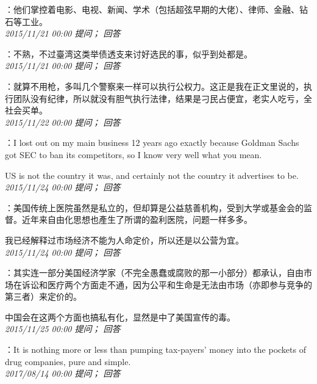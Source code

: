 \documentclass[twocolumn]{ctexart}
\begin{document}
：他们掌控着电影、电视、新闻、学术（包括超弦早期的大佬）、律师、金融、钻石等工业。\\

\textit{\hfill\noindent\small 2015/11/21 00:00 提问； 回答}

：不熟，不过臺湾这类举债透支来讨好选民的事，似乎到处都是。\\

\textit{\hfill\noindent\small 2015/11/21 00:00 提问； 回答}

：就算不用枪，多叫几个警察来一样可以执行公权力。这正是我在正文里说的，执行团队没有纪律，所以就没有胆气执行法律，结果是刁民占便宜，老实人吃亏，全社会买单。\\

\textit{\hfill\noindent\small 2015/11/22 00:00 提问； 回答}

：I lost out on my main business 12 years ago exactly because Goldman Sachs got SEC to ban its competitors, so I know very well what you mean.

US is not the country it was, and certainly not the country it advertises to be.\\

\textit{\hfill\noindent\small 2015/11/24 00:00 提问； 回答}

：美国传统上医院虽然是私立的，但却算是公益慈善机构，受到大学或基金会的监督。近年来自由化思想也產生了所谓的盈利医院，问题一样多多。

我已经解释过市场经济不能为人命定价，所以还是以公营为宜。\\

\textit{\hfill\noindent\small 2015/11/24 00:00 提问； 回答}

：其实连一部分美国经济学家（不完全愚蠢或腐败的那一小部分）都承认，自由市场在诉讼和医疗两个方面走不通，因为公平和生命是无法由市场（亦即参与竞争的第三者）来定价的。

中国会在这两个方面也搞私有化，显然是中了美国宣传的毒。\\

\textit{\hfill\noindent\small 2015/11/25 00:00 提问； 回答}

：It is nothing more or less than pumping tax-payers' money into the pockets of drug companies, pure and simple.\\

\textit{\hfill\noindent\small 2017/08/14 00:00 提问； 回答}
\end{document}
